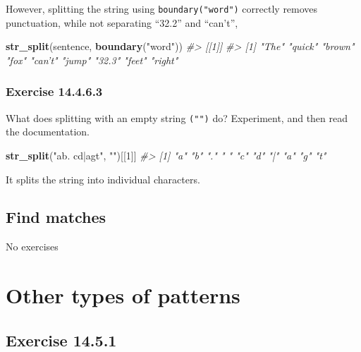 \documentclass[]{book}
\newenvironment{Shaded}{\begin{snugshade}}{\end{snugshade}}
\newcommand{\CommentTok}[1]{\textcolor[rgb]{0.56,0.35,0.01}{\textit{#1}}}
\newcommand{\DecValTok}[1]{\textcolor[rgb]{0.00,0.00,0.81}{#1}}
\newcommand{\KeywordTok}[1]{\textcolor[rgb]{0.13,0.29,0.53}{\textbf{#1}}}
\newcommand{\NormalTok}[1]{#1}
\newcommand{\StringTok}[1]{\textcolor[rgb]{0.31,0.60,0.02}{#1}}
\theoremstyle{plain}
\theoremstyle{remark}
\theoremstyle{definition}
\theoremstyle{definition}
\theoremstyle{definition}
\theoremstyle{remark}
\begin{document}
However, splitting the string using \texttt{boundary("word")} correctly
removes punctuation, while not separating ``32.2'' and ``can't'',

\begin{Shaded}
\begin{Highlighting}[]
\KeywordTok{str_split}\NormalTok{(sentence, }\KeywordTok{boundary}\NormalTok{(}\StringTok{"word"}\NormalTok{))}
\CommentTok{#> [[1]]}
\CommentTok{#> [1] "The"   "quick" "brown" "fox"   "can’t" "jump"  "32.3"  "feet"  "right"}
\end{Highlighting}
\end{Shaded}

\hypertarget{exercise-14.4.6.3}{%
\subsubsection*{\texorpdfstring{Exercise
{14.4.6.3}}{Exercise 14.4.6.3}}\label{exercise-14.4.6.3}}

What does splitting with an empty string \texttt{("")} do? Experiment,
and then read the documentation.

\begin{Shaded}
\begin{Highlighting}[]
\KeywordTok{str_split}\NormalTok{(}\StringTok{"ab. cd|agt"}\NormalTok{, }\StringTok{""}\NormalTok{)[[}\DecValTok{1}\NormalTok{]]}
\CommentTok{#>  [1] "a" "b" "." " " "c" "d" "|" "a" "g" "t"}
\end{Highlighting}
\end{Shaded}

It splits the string into individual characters.

\hypertarget{find-matches}{%
\subsection{Find matches}\label{find-matches}}

No exercises

\hypertarget{other-types-of-patterns}{%
\section{Other types of patterns}\label{other-types-of-patterns}}

\hypertarget{exercise-14.5.1}{%
\subsection*{\texorpdfstring{Exercise
{14.5.1}}{Exercise 14.5.1}}\label{exercise-14.5.1}}
\end{document}
